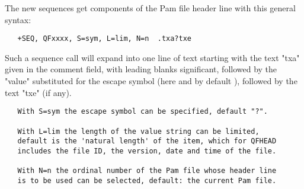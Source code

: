 The new sequences  get components of the Pam file header
line with this general syntax:
\begin{verbatim}
   +SEQ, QFxxxx, S=sym, L=lim, N=n  .txa?txe
\end{verbatim}
Such a sequence call will expand into one line of text starting
with the text "txa" given in the comment field, with leading
blanks significant, followed by the "value" substituted for the
escape symbol (here and by default ), followed by the text
"txe" (if any).
\begin{verbatim}
   With S=sym the escape symbol can be specified, default "?".

   With L=lim the length of the value string can be limited,
   default is the 'natural length' of the item, which for QFHEAD
   includes the file ID, the version, date and time of the file.

   With N=n the ordinal number of the Pam file whose header line
   is to be used can be selected, default: the current Pam file.
\end{verbatim}
